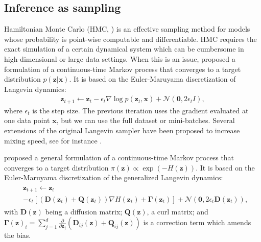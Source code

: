 \subsection{Inference as sampling}\label{sec:infassamp}

Hamiltonian Monte Carlo (HMC, \cite{neal2011mcmc}) is an effective sampling method for models whose probability is point-wise computable and differentiable. %
HMC requires the exact simulation of a certain dynamical system which can be cumbersome in high-dimensional or large data settings. When this is an issue, \cite{welling2011bayesian} proposed a formulation of a continuous-time Markov process that converges to a target distribution $p(\bm{z} | \bm{x})$. It is based on the Euler-Maruyama discretization of Langevin dynamics:
\begin{eqnarray}\label{eq:sgld}
\bm{z}_{t+1} \leftarrow \bm{z}_{t} - \epsilon_t \nabla \log p(\bm{z}_t,\bm{x})  + \mathcal{N}(\bm{0}, 2\epsilon_t I),
\end{eqnarray}
where $\epsilon_t$ is the step size. The previous iteration uses the gradient evaluated at one data point $\bm{x}$, but we can use the full dataset or mini-batches. Several extensions of the original Langevin sampler have been proposed to increase mixing speed, see for instance \cite{li2016preconditioned,li2016high,li2019communication}.

\cite{ma2015complete} proposed a general formulation of a continuous-time Markov process that converges to a target distribution $\pi(\bm{z}) \propto \exp (-H(\bm{z}))$. It is based on the Euler-Maruyama discretization of the generalized Langevin dynamics:
\begin{align}\label{eq:sgmcmc}
\begin{split}
&\bm{z}_{t+1} \leftarrow \bm{z}_{t} \\ & -\epsilon_t \left[ (\mathbf{D}(\bm{z}_t) + \mathbf{Q}(\bm{z}_t)) \nabla H(\bm{z}_t) + \mathbf{\Gamma}(\bm{z}_t) \right] + \mathcal{N}(\mathbf{0}, 2\epsilon_t \mathbf{D}(\bm{z}_t)),
\end{split}
\end{align}
with $\mathbf{D}(\bm{z})$ being a diffusion matrix; $\mathbf{Q}(\bm{z})$, a curl matrix; and $\mathbf{\Gamma}(\bm{z})_i = \sum_{j=1}^d \frac{\partial}{\partial \bm{z}_j} (\mathbf{D}_{ij}(\bm{z}) + \mathbf{Q}_{ij}(\bm{z})) $ is a correction term which amends the bias.

